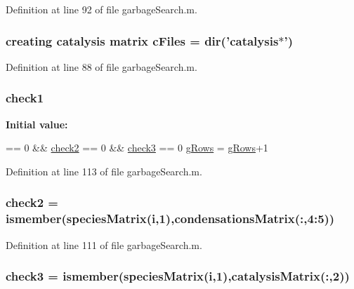 Definition at line 92 of file garbage\+Search.\+m.

\hypertarget{a00027_a9eab57ccb42a39c704f47dc30e4f4515}{
\subsubsection[{c\+Files}]{\setlength{\rightskip}{0pt plus 5cm}creating {\bf catalysis} matrix c\+Files = {\bf dir}('{\bf catalysis}$\ast$')}}\label{a00027_a9eab57ccb42a39c704f47dc30e4f4515}


Definition at line 88 of file garbage\+Search.\+m.

\hypertarget{a00027_a62c10db322670bdabb633eb294c4fcec}{
\subsubsection[{check1}]{ check1}}\label{a00027_a62c10db322670bdabb633eb294c4fcec}
{\bfseries Initial value\+:}
\begin{DoxyCode}
== 0 && \hyperlink{a00027_a98a8838a85ed24032563a44271b1525a}{check2} == 0 && \hyperlink{a00027_adfd17509248a56986475a25ee50fe488}{check3} == 0
            \hyperlink{a00027_af33e0ef530936979d29418a30cb262d0}{gRows} = \hyperlink{a00027_af33e0ef530936979d29418a30cb262d0}{gRows}+1
\end{DoxyCode}


Definition at line 113 of file garbage\+Search.\+m.

\hypertarget{a00027_a98a8838a85ed24032563a44271b1525a}{
\subsubsection[{check2}]{\setlength{\rightskip}{0pt plus 5cm}check2 = ismember({\bf species\+Matrix}({\bf i},1),{\bf condensations\+Matrix}(\+:,4\+:5))}}\label{a00027_a98a8838a85ed24032563a44271b1525a}


Definition at line 111 of file garbage\+Search.\+m.

\hypertarget{a00027_adfd17509248a56986475a25ee50fe488}{
\subsubsection[{check3}]{\setlength{\rightskip}{0pt plus 5cm}check3 = ismember({\bf species\+Matrix}({\bf i},1),{\bf catalysis\+Matrix}(\+:,2))}}\label{a00027_adfd17509248a56986475a25ee50fe488}


